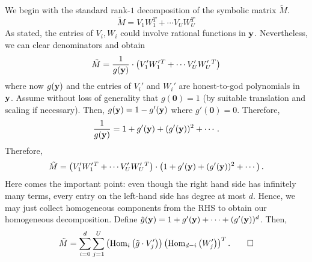 We begin with the standard rank-$1$ decomposition of the symbolic matrix $\tilde{M}$.
\[
  \tilde{M} = V_1 W_1^T + \cdots V_U W_U^T
\]
As stated, the entries of $V_i,W_i$ could involve rational functions in $\mathbf{y}$. Nevertheless, we can clear denominators and obtain
\[
\tilde{M} = \frac{1}{g(\mathbf{y})} \cdot \left(V'_1 W'_1{}^T + \cdots V'_U W'_U{}^T\right)
\]
where now $g(\mathbf{y})$ and the entries of $V_i'$ and $W_i'$ are honest-to-god polynomials in $\mathbf{y}$. Assume without loss of generality that $g(\mathbf{0}) = 1$ (by suitable translation and scaling if necessary). Then, $g(\mathbf{y}) = 1 - g'(\mathbf{y})$ where $g'(\mathbf{0}) = 0$. Therefore,
\[
\frac{1}{g(\mathbf{y})} = 1 + g'(\mathbf{y}) + (g'(\mathbf{y}))^2 + \cdots . 
\]
Therefore, 
\[
  \tilde{M} = \left(V'_1 W'_1{}^T + \cdots V'_U W'_U{}^T\right) \cdot \left(1 + g'(\mathbf{y}) + (g'(\mathbf{y}))^2 + \cdots\right).
\]
Here comes the important point: even though the right hand side has infinitely many terms, every entry on the left-hand side has degree at most $d$. Hence, we may just collect homogeneous components from the RHS to obtain our homogeneous decomposition. Define $\tilde{g}(\mathbf{y}) = 1 + g'(\mathbf{y}) + \cdots + (g'(\mathbf{y}))^d$. Then,
\[
  \tilde{M} = \sum_{i=0}^d \sum_{j=1}^U \left(\operatorname{Hom}_{ i}\left(\tilde{g} \cdot V_j'\right)\right) \left(\operatorname{Hom}_{d - i}\left(W_j'\right)\right)^T. \qed
\]
